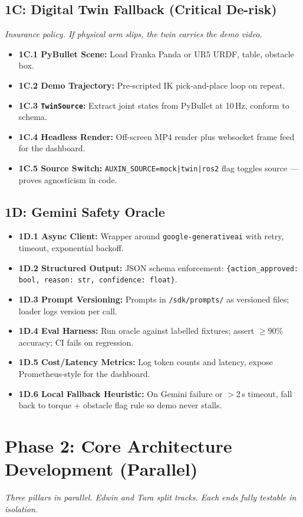 \documentclass[11pt, a4paper]{article}
\begin{document}
\subsection*{1C: Digital Twin Fallback (Critical De-risk)}
\textit{Insurance policy. If physical arm slips, the twin carries the demo video.}
\begin{itemize}
    \item \textbf{1C.1 PyBullet Scene:} Load Franka Panda or UR5 URDF, table, obstacle box.
    \item \textbf{1C.2 Demo Trajectory:} Pre-scripted IK pick-and-place loop on repeat.
    \item \textbf{1C.3 \texttt{TwinSource}:} Extract joint states from PyBullet at 10\,Hz, conform to schema.
    \item \textbf{1C.4 Headless Render:} Off-screen MP4 render plus websocket frame feed for the dashboard.
    \item \textbf{1C.5 Source Switch:} \texttt{AUXIN\_SOURCE=mock|twin|ros2} flag toggles source --- proves agnosticism in code.
\end{itemize}

\subsection*{1D: Gemini Safety Oracle}
\begin{itemize}
    \item \textbf{1D.1 Async Client:} Wrapper around \texttt{google-generativeai} with retry, timeout, exponential backoff.
    \item \textbf{1D.2 Structured Output:} JSON schema enforcement: \texttt{\{action\_approved: bool, reason: str, confidence: float\}}.
    \item \textbf{1D.3 Prompt Versioning:} Prompts in \texttt{/sdk/prompts/} as versioned files; loader logs version per call.
    \item \textbf{1D.4 Eval Harness:} Run oracle against labelled fixtures; assert $\geq 90\%$ accuracy; CI fails on regression.
    \item \textbf{1D.5 Cost/Latency Metrics:} Log token counts and latency, expose Prometheus-style for the dashboard.
    \item \textbf{1D.6 Local Fallback Heuristic:} On Gemini failure or $>$2\,s timeout, fall back to torque + obstacle flag rule so demo never stalls.
\end{itemize}

\section{Phase 2: Core Architecture Development (Parallel)}
\textit{Three pillars in parallel. Edwin and Tara split tracks. Each ends fully testable in isolation.}
\end{document}
